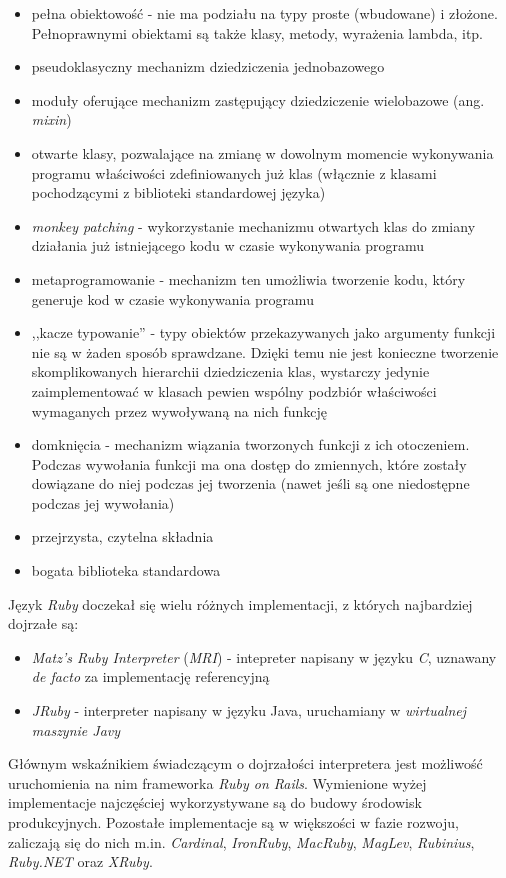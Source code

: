 \documentclass[a4paper,12pt]{article}
\begin{document}
\begin{itemize}
\item pełna obiektowość - nie ma podziału na typy proste (wbudowane) i
  złożone. Pełnoprawnymi obiektami są także klasy, metody, wyrażenia
  lambda, itp.
\item pseudoklasyczny mechanizm dziedziczenia jednobazowego
\item moduły oferujące mechanizm zastępujący dziedziczenie wielobazowe
  (ang. \emph{mixin})
\item otwarte klasy, pozwalające na zmianę w dowolnym momencie
  wykonywania programu właściwości zdefiniowanych już klas (włącznie z
  klasami pochodzącymi z biblioteki standardowej języka)
\item \emph{monkey patching} - wykorzystanie mechanizmu otwartych klas
  do zmiany działania już istniejącego kodu w czasie wykonywania
  programu
\item metaprogramowanie - mechanizm ten umożliwia tworzenie kodu,
  który generuje kod w czasie wykonywania programu
\item ,,kacze typowanie'' - typy obiektów przekazywanych jako
  argumenty funkcji nie są w żaden sposób sprawdzane. Dzięki temu nie
  jest konieczne tworzenie skomplikowanych hierarchii dziedziczenia
  klas, wystarczy jedynie zaimplementować w klasach pewien wspólny
  podzbiór właściwości wymaganych przez wywoływaną na nich funkcję
\item domknięcia - mechanizm wiązania tworzonych funkcji z ich
  otoczeniem. Podczas wywołania funkcji ma ona dostęp do zmiennych,
  które zostały dowiązane do niej podczas jej tworzenia (nawet jeśli
  są one niedostępne podczas jej wywołania)
\item przejrzysta, czytelna składnia
\item bogata biblioteka standardowa
\end{itemize}

Język \emph{Ruby} doczekał się wielu różnych implementacji, z których
najbardziej dojrzałe są:

\begin{itemize}
\item \emph{Matz's Ruby Interpreter} (\emph{MRI}) - intepreter
  napisany w języku \emph{C}, uznawany \emph{de facto} za
  implementację referencyjną
\item \emph{JRuby} - interpreter napisany w języku Java, uruchamiany w
  \emph{wirtualnej maszynie Javy}
\end{itemize}

Głównym wskaźnikiem świadczącym o dojrzałości interpretera jest
możliwość uruchomienia na nim frameworka \emph{Ruby on
  Rails}. Wymienione wyżej implementacje najczęściej wykorzystywane są
do budowy środowisk produkcyjnych. Pozostałe implementacje są w
większości w fazie rozwoju, zaliczają się do nich
m.in. \emph{Cardinal}, \emph{IronRuby}, \emph{MacRuby}, \emph{MagLev},
\emph{Rubinius}, \emph{Ruby.NET} oraz \emph{XRuby}.
\end{document}
